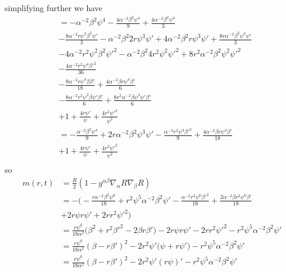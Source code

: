 \documentclass[12pt]{article}
\numberwithin{equation}{section}
\begin{document}
simplifying further we have
\begin{equation}
\begin{aligned}
&=-\alpha^{-2} \beta^2 \psi^4 - \frac{4 \alpha^{-2} \beta^2 \psi^4}{9} + \frac{4 \alpha^{-2} \beta^2 \psi^4}{3} \\
&- \frac{8 \alpha^{-2} r \psi^3 \beta^2  \psi'}{3} - \alpha^{-2} \beta^2 2 r \psi^3 \psi' + 4 \alpha^{-2} \beta^2 r \psi^3 \psi' + \frac{8 r \alpha^{-2} \beta^2 \psi^3 \psi'}{3}\\
&- 4 \alpha^{-2} r^2 \psi^2 \beta^2 \psi'^2  - \alpha^{-2} \beta^2 4 r^2 \psi^2 \psi'^2 + 8 r^2 \alpha^{-2} \beta^2 \psi^2 \psi'^2 \\
&- \frac{4 \alpha^{-2} r^2 \psi^4 \beta'^2}{36} \\
&- \frac{8 \alpha^{-2} r \psi^4 \beta \beta'}{18} + \frac{4 \alpha^{-2} \beta r \psi^4 \beta'}{6} \\
&- \frac{8 \alpha^{-2} r^2 \psi^3 \beta \psi' \beta'}{6} + \frac{8 r^2 \alpha^{-2} \beta \psi^3 \psi' \beta'}{6} \\
&+ 1 + \frac{4 r \psi'}{\psi} + \frac{4 r^2 \psi'^2}{\psi^2} \\
&=-\frac{\alpha^{-2} \beta^2 \psi^4}{9} + 2 r \alpha^{-2} \beta^2 \psi^3 \psi' - \frac{\alpha^{-2} r^2 \psi^4 \beta'^2}{9} + \frac{4 \alpha^{-2} \beta r \psi^4 \beta'}{18} \\
&+ 1 + \frac{4 r \psi'}{\psi} + \frac{4 r^2 \psi'^2}{\psi^2} \\
\end{aligned}
\end{equation}
so
\begin{equation}
\begin{aligned}
m(r, t) &= \frac{R}{2} (1 - g^{\alpha \beta} \nabla_\alpha R \nabla_\beta R) \\
&= - \Big( -\frac{r \alpha^{-2} \beta^2 \psi^6}{18} + r^2 \psi^5 \alpha^{-2} \beta^2 \psi' - \frac{\alpha^{-2} r^3 \psi^6 \beta'^2}{18} + \frac{2 \alpha^{-2} \beta r^2 \psi^6 \beta'}{18} \\
&+ 2 r \psi r \psi' + 2 r r^2 \psi'^2  \Big) \\
&= \frac{r \psi^6}{18 \alpha^2} \Big( \beta^2 + r^2 \beta'^2 - 2 \beta r \beta' \Big) - 2 r \psi r \psi' - 2 r r^2 \psi'^2 - r^2 \psi^5 \alpha^{-2} \beta^2 \psi' \\
&= \frac{r \psi^6}{18 \alpha^2} (\beta - r \beta')^2 - 2 r^2 \psi' \Big( \psi + r \psi' \Big) - r^2 \psi^5 \alpha^{-2} \beta^2 \psi' \\
&= \frac{r \psi^6}{18 \alpha^2} (\beta - r \beta')^2 - 2 r^2 \psi' (r \psi)' - r^2 \psi^5 \alpha^{-2} \beta^2 \psi' \\
\end{aligned}
\end{equation}
\end{document}
